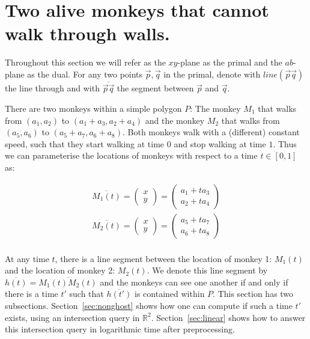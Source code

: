 \documentclass{article}
\begin{document}
\section{Two alive monkeys that cannot walk through walls.}




Throughout this section we will refer as the $xy$-plane as the primal and the $ab$-plane as the dual. For any two points $\vec{p}, \vec{q}$ in the primal, denote  with $line(\vec{p}\vec{q})$ the line through and with $\overline{\vec{p}\vec{q}}$ the segment between $\vec{p}$ and $\vec{q}$.

There are two monkeys within a simple polygon $P$: The monkey $M_1$ that walks from $(a_1, a_2)$ to $(a_1 + a_3, a_2 + a_4)$ and the monkey $M_2$ that walks from  $(a_5, a_6)$ to $(a_5 + a_7, a_6 + a_8)$. Both monkeys walk with a (different) constant speed, such that they start  walking at time $0$ and stop walking at time $1$.  Thus we can parameterise the locations of monkeys with respect to a time $t \in [0,1]$ as: 

\begin{align*}
    \overline{M_1(t)} = \left( \begin{array}{c}
         x  \\
         y 
    \end{array}  \right) = \left( \begin{array}{c}
         a_1 + t a_3  \\
         a_2 + t a_4
    \end{array} \right)  \\
    \overline{M_2(t)} = \left( \begin{array}{c}
         x  \\
         y 
    \end{array}  \right) = \left( \begin{array}{c}
         a_5 + t a_7  \\
         a_6 + t a_8
    \end{array} \right)  \\
\end{align*}

At any time $t$, there is a line segment between the location of monkey 1: $M_1(t)$ and the location of monkey 2: $M_2(t)$. We denote this line segment by $\overline{h(t)}= \overline{M_1(t)M_2(t)}$ and the monkeys can see one another if and only if there is a time $t'$ such that $\overline{h(t')}$ is contained within $P$. This section has two subsections. Section~\ref{sec:nonghost} shows how one can compute if such a time $t'$ exists, using an intersection query in $\mathbb{R}^2$. Section~\ref{sec:linear} shows how to answer this intersection query in logarithmic time after preprocessing.
\end{document}
